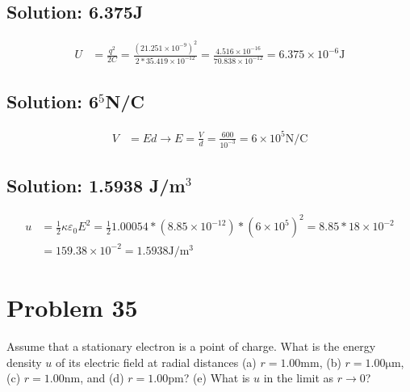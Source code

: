 \documentclass[12pt]{article}
\begin{document}
\subsection{Solution: 6.375\textmu J}
\begin{align*}
    U   &=  \frac{q^2}{2C}
        =   \frac{(21.251 \times 10^{-9})^2}{2*35.419 \times 10^{-12}}
        =   \frac{4.516 \times 10^{-16}}{70.838 \times 10^{-12}}
        =   \boxed{6.375 \times 10^{-6} \unit{\joule}}
\end{align*}

\subsection{Solution: 6$^5$N/C}
\begin{align*}
    V   &=  Ed \rightarrow
    E   =   \frac{V}{d}
        =   \frac{600}{10^{-3}}
        =   \boxed{6 \times 10^5 \unit{\newton/\coulomb}}
\end{align*}

\subsection{Solution: 1.5938 J/m$^3$}
\begin{align*}
    u   &=  \frac{1}{2}\kappa\varepsilon_0 E^2
        =   \frac{1}{2}1.00054*(8.85 \times 10^{-12})*(6 \times 10^5)^2
        =   8.85 * 18 \times 10^{-2}\\
        &=  159.38 \times 10^{-2}
        =   \boxed{1.5938 \unit{\joule/\meter^3}}
\end{align*}

\pagebreak
\section{Problem 35}
Assume that a stationary electron is a point of charge. 
What is the energy density $u$ of its electric field at radial distances (a) $r = 1.00 \unit{\milli\meter}$, (b) $r = 1.00 \unit{\micro\meter}$, (c) $r = 1.00 \unit{\nano\meter}$, and (d) $r = 1.00 \unit{\pico\meter}$? 
(e) What is $u$ in the limit as $r \rightarrow 0$?
\end{document}
